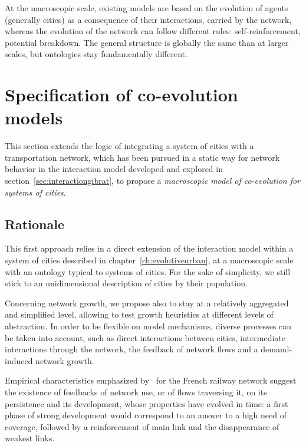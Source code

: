 At the macroscopic scale, existing models are based on the evolution of agents (generally cities) as a consequence of their interactions, carried by the network, whereas the evolution of the network can follow different rules: self-reinforcement, potential breakdown. The general structure is globally the same than at larger scales, but ontologies stay fundamentally different.





\section{Specification of co-evolution models}

This section extends the logic of integrating a system of cities with a transportation network, which has been pursued in a static way for network behavior in the interaction model developed and explored in section~\ref{sec:interactiongibrat}, to propose a \emph{macroscopic model of co-evolution for systems of cities}.


\subsection{Rationale}

This first approach relies in a direct extension of the interaction model within a system of cities described in chapter~\ref{ch:evolutiveurban}, at a macroscopic scale with an ontology typical to systems of cities. For the sake of simplicity, we still stick to an unidimensional description of cities by their population.


Concerning network growth, we propose also to stay at a relatively aggregated and simplified level, allowing to test growth heuristics at different levels of abstraction. In order to be flexible on model mechanisms, diverse processes can be taken into account, such as direct interactions between cities, intermediate interactions through the network, the feedback of network flows and a demand-induced network growth.


Empirical characteristics emphasized by~\cite{thevenin2013mapping} for the French railway network suggest the existence of feedbacks of network use, or of flows traversing it, on its persistence and its development, whose properties have evolved in time: a first phase of strong development would correspond to an answer to a high need of coverage, followed by a reinforcement of main link and the disappearance of weakest links.


